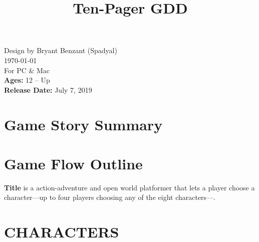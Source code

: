 \documentclass[11pt]{article}
\title{Ten-Pager GDD}
\begin{document}
	\begin{titlepage}
		\begin{center}
			\doublespacing
			Design by Bryant Benzant (Spadyal) \\
			\mydate\today \\
			For PC \& Mac \\
			\textbf{Ages:} 12 -- Up \\
			\textbf{Release Date:} July 7, 2019
		\end{center}
	\end{titlepage}
	\section*{Game Story Summary}
	
	\section*{Game Flow Outline}
	\textbf{Title} is a action-adventure and open world platformer that lets a player choose a character---up to four players choosing any of the eight characters---.
	\newpage
	\section*{CHARACTERS}
	
	\subsection*{}
	
	\subsection*{}
	
	\subsection*{}
	
	\subsection*{}
	
	\subsection*{}
	
	\subsection*{}
	
\end{document}

